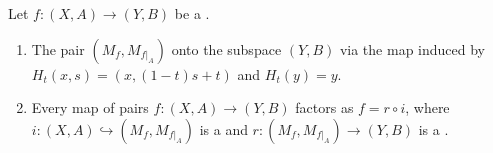 \begin{proposition} \label{proposition:homotopy_properties_of_mapping_cylinder_for_pairs}
Let $f: (X, A) \to (Y, B)$ be a . 

\begin{enumerate}
    \item The pair $(M_f, M_{f|_A})$  onto the subspace $(Y, B)$ via the map induced by $H_t(x, s) = (x, (1-t)s + t)$ and $H_t(y) = y$.
    
    \item Every map of pairs $f: (X, A) \to (Y, B)$ factors as $f = r \circ i$, where $i: (X, A) \hookrightarrow (M_f, M_{f|_A})$ is a  and $r: (M_f, M_{f|_A}) \to (Y, B)$ is a .
\end{enumerate}
\end{proposition}